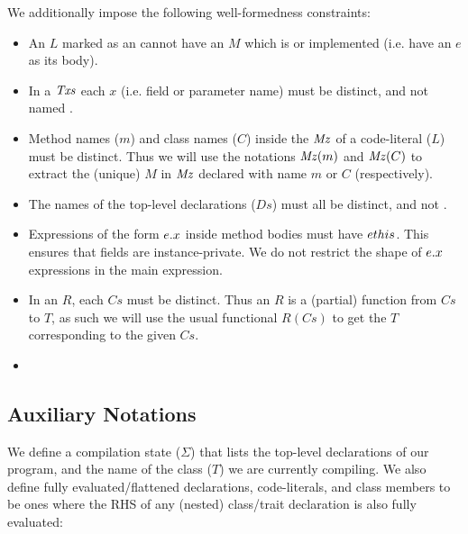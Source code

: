 We additionally impose the following well-formedness constraints:
\begin{itemize}
	\item An $L$ marked as an  cannot have an $M$ which is  or implemented (i.e. have an $e$ as its body).
	
	\item In a $\mathit{Txs}$ each $x$ (i.e. field or parameter name) must be distinct, and not named . 
	
	\item Method names ($m$) and class names ($C$) inside the $\mathit{Mz}$ of a code-literal ($L$) must be distinct. Thus we will use the notations $\mathit{Mz}(m)$ and $\mathit{Mz}(C)$ to extract the (unique) $M$ in $\mathit{Mz}$ declared with name $m$ or $C$ (respectively).
	
	\item The names of the top-level declarations ($Ds$) must all be distinct, and not \This.

	\item Expressions of the form $\ef{e}{x}$ inside method bodies must have $e \Q{this}$. This ensures that fields are instance-private. We do not restrict the shape of $\ef{e}{x}$ expressions in the main expression. 
	
	\item In an $R$, each $Cs$ must be distinct. Thus an $R$ is a (partial) function from $Cs$ to $T$, as such we will use the usual functional $R(Cs)$ to get the $T$ corresponding to the given $Cs$. 
	\item {}
\end{itemize}


\subsection{Auxiliary Notations}
We define a compilation state ($\Sigma$) that lists the top-level declarations of our program, and the name of the class ($T$) we are currently compiling. We also define fully evaluated/flattened declarations, code-literals, and class members to be ones where the RHS of any (nested) class/trait declaration is also fully evaluated:

\begin{grammar}
	\midrule
\end{grammar}



